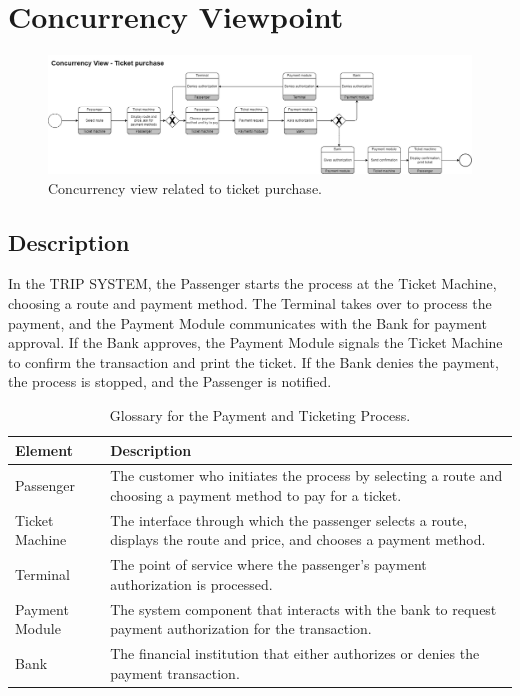 \section{Concurrency Viewpoint}

\begin{figure}[H]
    \centering
    \includegraphics[width=\textwidth]{drawings/views_final_version/concurrency_view_1.png}
    \caption{Concurrency view related to ticket purchase.}
    \label{fig:concurrency_view_1}
\end{figure}

\subsection*{Description}
In the TRIP SYSTEM, the Passenger starts the process at the Ticket Machine, choosing a route and payment method. The Terminal takes over to process the payment, and the Payment Module communicates with the Bank for payment approval. If the Bank approves, the Payment Module signals the Ticket Machine to confirm the transaction and print the ticket. If the Bank denies the payment, the process is stopped, and the Passenger is notified.

\begin{table}[H]
    \centering
    \caption{Glossary for the Payment and Ticketing Process.}
    \label{tab:payment_ticketing_glossary}
    \begin{tabularx}{\textwidth}{@{}lX@{}} %
    \toprule
    \textbf{Element} & \textbf{Description} \\
    \midrule
    Passenger & The customer who initiates the process by selecting a route and choosing a payment method to pay for a ticket. \\
    Ticket Machine & The interface through which the passenger selects a route, displays the route and price, and chooses a payment method. \\
    Terminal & The point of service where the passenger's payment authorization is processed. \\
    Payment Module & The system component that interacts with the bank to request payment authorization for the transaction. \\
    Bank & The financial institution that either authorizes or denies the payment transaction. \\
    \bottomrule
    \end{tabularx}
\end{table}

